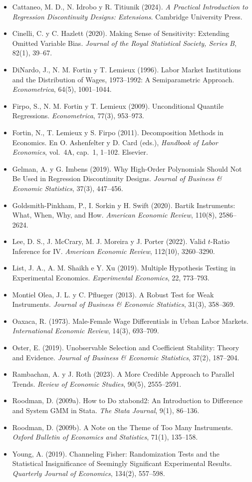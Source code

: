 \documentclass[11pt,a4paper]{article}
\begin{document}
{\begin{itemize}[leftmargin=1.4em,itemsep=1pt,label={}]
\item Cattaneo, M. D., N. Idrobo y R. Titiunik (2024). \emph{A Practical Introduction to Regression Discontinuity Designs: Extensions}. Cambridge University Press.
\item Cinelli, C. y C. Hazlett (2020). Making Sense of Sensitivity: Extending Omitted Variable Bias. \emph{Journal of the Royal Statistical Society, Series B}, 82(1), 39--67.
\item DiNardo, J., N. M. Fortin y T. Lemieux (1996). Labor Market Institutions and the Distribution of Wages, 1973--1992: A Semiparametric Approach. \emph{Econometrica}, 64(5), 1001--1044.
\item Firpo, S., N. M. Fortin y T. Lemieux (2009). Unconditional Quantile Regressions. \emph{Econometrica}, 77(3), 953--973.
\item Fortin, N., T. Lemieux y S. Firpo (2011). Decomposition Methods in Economics. En O. Ashenfelter y D. Card (eds.), \emph{Handbook of Labor Economics}, vol.~4A, cap.~1, 1--102. Elsevier.
\item Gelman, A. y G. Imbens (2019). Why High-Order Polynomials Should Not Be Used in Regression Discontinuity Designs. \emph{Journal of Business \& Economic Statistics}, 37(3), 447--456.
\item Goldsmith-Pinkham, P., I. Sorkin y H. Swift (2020). Bartik Instruments: What, When, Why, and How. \emph{American Economic Review}, 110(8), 2586--2624.
\item Lee, D. S., J. McCrary, M. J. Moreira y J. Porter (2022). Valid $t$-Ratio Inference for IV. \emph{American Economic Review}, 112(10), 3260--3290.
\item List, J. A., A. M. Shaikh e Y. Xu (2019). Multiple Hypothesis Testing in Experimental Economics. \emph{Experimental Economics}, 22, 773--793.
\item Montiel Olea, J. L. y C. Pflueger (2013). A Robust Test for Weak Instruments. \emph{Journal of Business \& Economic Statistics}, 31(3), 358--369.
\item Oaxaca, R. (1973). Male-Female Wage Differentials in Urban Labor Markets. \emph{International Economic Review}, 14(3), 693--709.
\item Oster, E. (2019). Unobservable Selection and Coefficient Stability: Theory and Evidence. \emph{Journal of Business \& Economic Statistics}, 37(2), 187--204.
\item Rambachan, A. y J. Roth (2023). A More Credible Approach to Parallel Trends. \emph{Review of Economic Studies}, 90(5), 2555--2591.
\item Roodman, D. (2009a). How to Do xtabond2: An Introduction to Difference and System GMM in Stata. \emph{The Stata Journal}, 9(1), 86--136.
\item Roodman, D. (2009b). A Note on the Theme of Too Many Instruments. \emph{Oxford Bulletin of Economics and Statistics}, 71(1), 135--158.
\item Young, A. (2019). Channeling Fisher: Randomization Tests and the Statistical Insignificance of Seemingly Significant Experimental Results. \emph{Quarterly Journal of Economics}, 134(2), 557--598.
\end{itemize}
}
\end{document}
